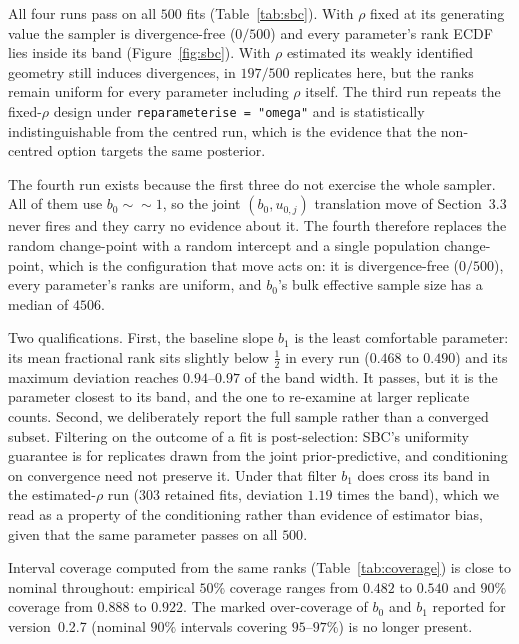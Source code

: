 \documentclass[12pt]{article}
\newcommand{\code}[1]{\texttt{#1}}
\begin{document}
All four runs pass on all $500$ fits (Table~\ref{tab:sbc}). With $\rho$ fixed at its generating value the sampler is divergence-free ($0/500$) and every parameter's rank ECDF lies inside its band (Figure~\ref{fig:sbc}). With $\rho$ estimated its weakly identified geometry still induces divergences, in $197/500$ replicates here, but the ranks remain uniform for every parameter including $\rho$ itself. The third run repeats the fixed-$\rho$ design under \code{reparameterise = "omega"} and is statistically indistinguishable from the centred run, which is the evidence that the non-centred option targets the same posterior.

The fourth run exists because the first three do not exercise the whole sampler. All of them use $b_0 \sim {\sim}1$, so the joint $(b_0, u_{0,j})$ translation move of Section~3.3 never fires and they carry no evidence about it. The fourth therefore replaces the random change-point with a random intercept and a single population change-point, which is the configuration that move acts on: it is divergence-free ($0/500$), every parameter's ranks are uniform, and $b_0$'s bulk effective sample size has a median of $4506$.

Two qualifications. First, the baseline slope $b_1$ is the least comfortable parameter: its mean fractional rank sits slightly below $\tfrac{1}{2}$ in every run ($0.468$ to $0.490$) and its maximum deviation reaches $0.94$--$0.97$ of the band width. It passes, but it is the parameter closest to its band, and the one to re-examine at larger replicate counts. Second, we deliberately report the full sample rather than a converged subset. Filtering on the outcome of a fit is post-selection: SBC's uniformity guarantee is for replicates drawn from the joint prior-predictive, and conditioning on convergence need not preserve it. Under that filter $b_1$ does cross its band in the estimated-$\rho$ run ($303$ retained fits, deviation $1.19$ times the band), which we read as a property of the conditioning rather than evidence of estimator bias, given that the same parameter passes on all $500$.

Interval coverage computed from the same ranks (Table~\ref{tab:coverage}) is close to nominal throughout: empirical $50\%$ coverage ranges from $0.482$ to $0.540$ and $90\%$ coverage from $0.888$ to $0.922$. The marked over-coverage of $b_0$ and $b_1$ reported for version~0.2.7 (nominal $90\%$ intervals covering $95$--$97\%$) is no longer present.
\end{document}
